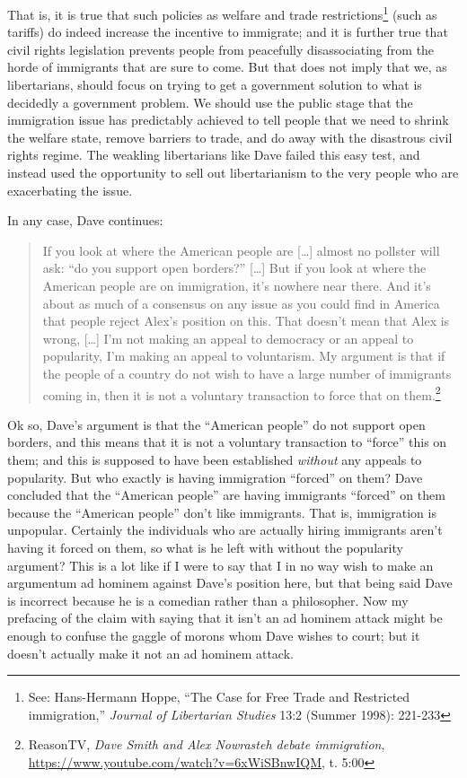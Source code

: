\documentclass[11pt]{article}
\begin{document}
That is, it is true that such policies as welfare and trade restrictions\footnote{See: Hans-Hermann Hoppe, ``The Case for Free Trade and Restricted immigration,'' \emph{Journal of Libertarian Studies} 13:2 (Summer 1998): 221-233} (such as tariffs) do indeed increase the incentive to immigrate; and it is further true that civil rights legislation prevents people from peacefully disassociating from the horde of immigrants that are sure to come. But that does not imply that we, as libertarians, should focus on trying to get a government solution to what is decidedly a government problem. We should use the public stage that the immigration issue has predictably achieved to tell people that we need to shrink the welfare state, remove barriers to trade, and do away with the disastrous civil rights regime. The weakling libertarians like Dave failed this easy test, and instead used the opportunity to sell out libertarianism to the very people who are exacerbating the issue.

In any case, Dave continues:
\begin{quote}
If you look at where the American people are [\ldots{}] almost no pollster will ask: ``do you support open borders?'' [\ldots{}] But if you look at where the American people are on immigration, it's nowhere near there. And it's about as much of a consensus on any issue as you could find in America that people reject Alex's position on this. That doesn't mean that Alex is wrong, [\ldots{}] I'm not making an appeal to democracy or an appeal to popularity, I'm making an appeal to voluntarism. My argument is that if the people of a country do not wish to have a large number of immigrants coming in, then it is not a voluntary transaction to force that on them.\footnote{ReasonTV, \emph{Dave Smith and Alex Nowrasteh debate immigration}, \url{https://www.youtube.com/watch?v=6xWiSBnwIQM}, t. 5:00}
\end{quote}

Ok so, Dave's argument is that the ``American people'' do not support open borders, and this means that it is not a voluntary transaction to ``force'' this on them; and this is supposed to have been established \emph{without} any appeals to popularity. But who exactly is having immigration ``forced'' on them? Dave concluded that the ``American people'' are having immigrants ``forced'' on them because the ``American people'' don't like immigrants. That is, immigration is unpopular. Certainly the individuals who are actually hiring immigrants aren't having it forced on them, so what is he left with without the popularity argument? This is a lot like if I were to say that I in no way wish to make an argumentum ad hominem against Dave's position here, but that being said Dave is incorrect because he is a comedian rather than a philosopher. Now my prefacing of the claim with saying that it isn't an ad hominem attack might be enough to confuse the gaggle of morons whom Dave wishes to court; but it doesn't actually make it not an ad hominem attack.
\end{document}
